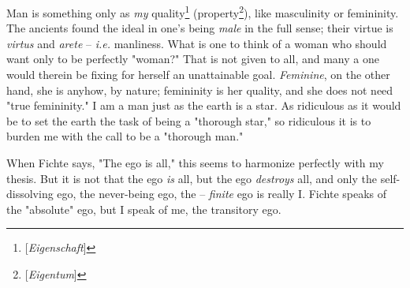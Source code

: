 \documentclass[a4paper]{book}
\begin{document}
Man is something only as \textit{my} quality\footnote{[\textit{Eigenschaft}]} 
(property\footnote{[\textit{Eigentum}]}), like masculinity or femininity. The 
ancients found the ideal in one's being \textit{male} in the full sense; their 
virtue is \textit{virtus} and \textit{arete} -- \textit{i.e.} manliness. What 
is one to think of a woman who should want only to be perfectly "{}woman?"{} 
That is not given to all, and many a one would therein be fixing for herself 
an unattainable goal. \textit{Feminine}, on the other hand, she is anyhow, by 
nature; femininity is her quality, and she does not need "{}true 
femininity."{} I am a man just as the earth is a star. As ridiculous as it 
would be to set the earth the task of being a "{}thorough star,"{} so 
ridiculous it is to burden me with the call to be a "{}thorough man."{}

When Fichte says, "{}The ego is all,"{} this seems to harmonize perfectly with 
my thesis. But it is not that the ego \textit{is} all, but the ego 
\textit{destroys} all, and only the self-dissolving ego, the never-being ego, 
the -- \textit{finite} ego is really I. Fichte speaks of the "{}absolute"{} 
ego, but I speak of me, the transitory ego.
\end{document}
